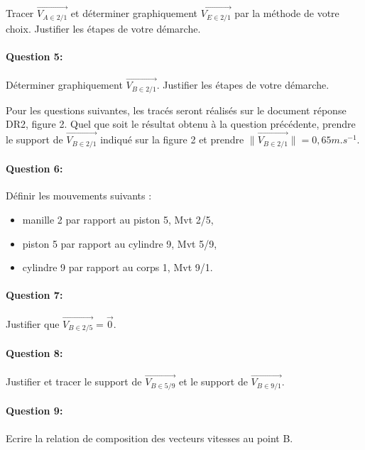Tracer $\overrightarrow{V_{A \in 2/1}}$ et déterminer graphiquement $\overrightarrow{V_{E \in 2/1}}$ par la méthode de votre choix. Justifier les étapes de votre démarche.

\paragraph{Question 5:}

Déterminer graphiquement $\overrightarrow{V_{B \in 2/1}}$. Justifier les étapes de votre démarche.

Pour les questions suivantes, les tracés seront réalisés sur le document réponse DR2, figure 2. Quel que soit le résultat obtenu à la question précédente, prendre le support de $\overrightarrow{V_{B \in 2/1}}$ indiqué sur la figure 2 et prendre $\|\overrightarrow{V_{B \in 2/1}}\|=0,65m.s^{-1}$.

\paragraph{Question 6:}

Définir les mouvements suivants :
\begin{itemize}
 \item manille 2 par rapport au piston 5, Mvt 2/5,
 \item piston 5 par rapport au cylindre 9, Mvt 5/9,
 \item cylindre 9 par rapport au corps 1, Mvt 9/1.
\end{itemize}

\paragraph{Question 7:}

Justifier que $\overrightarrow{V_{B \in 2/5}}=\vec{0}$.

\paragraph{Question 8:}

Justifier et tracer le support de $\overrightarrow{V_{B \in 5/9}}$ et le support de $\overrightarrow{V_{B \in 9/1}}$.

\paragraph{Question 9:}

Ecrire la relation de composition des vecteurs vitesses au point B.

